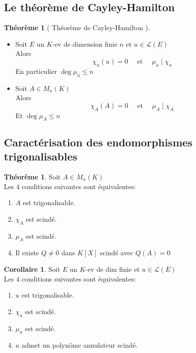 \documentclass[10pt,a4paper]{article}
\theoremstyle{definition}
\newtheorem{theorem}[proposition]{Théorème}
\newtheorem{corollaire}[proposition]{Corollaire}
\begin{document}
\subsection{Le théorème de Cayley-Hamilton}
\begin{theorem} [ Théorème de Cayley-Hamilton ]
\hfill \begin{itemize}
\item Soit $E$ un $K$-ev de dimension finie $n$ et $u \in \mathcal{L}(E)$ \\
Alors
\[ \boxed{\chi_u(u) = 0} \quad \text{ et } \quad \boxed{\mu_u \mid \chi_u} \]
En particulier $\boxed{\deg \mu_u \leq n}$
\item Soit $A \in M_n(K)$ \\
Alors 
\[ \boxed{\chi_A(A) = 0} \quad \text{ et } \quad \boxed{\mu_A \mid \chi_A} \]
Et $\boxed{\deg \mu_A \leq n}$
\end{itemize}
\end{theorem}

\subsection{Caractérisation des endomorphismes trigonalisables}
\renewcommand{\labelenumi}{(\roman{enumi})}
\begin{theorem}
Soit $A \in M_n(K)$ \\
Les $4$ conditions suivantes sont équivalentes:
\begin{enumerate}
\item $A$ est trigonalisable.
\item $\chi_A$ est scindé.
\item $\mu_A$ est scindé.
\item Il existe $Q \neq 0$ dans $K[X]$ scindé avec $Q(A) = 0$
\end{enumerate}
\end{theorem}
\begin{corollaire}
Soit $E$ un $K$-ev de dim finie et $u \in \mathcal{L}(E)$ \\
Les $4$ conditions suivantes sont équivalentes:
\begin{enumerate}
\item $u$ est trigonalisable.
\item $\chi_u$ est scindé.
\item $\mu_u$ est scindé.
\item $u$ admet un polynôme annulateur scindé.
\end{enumerate}
\end{corollaire}
\end{document}

